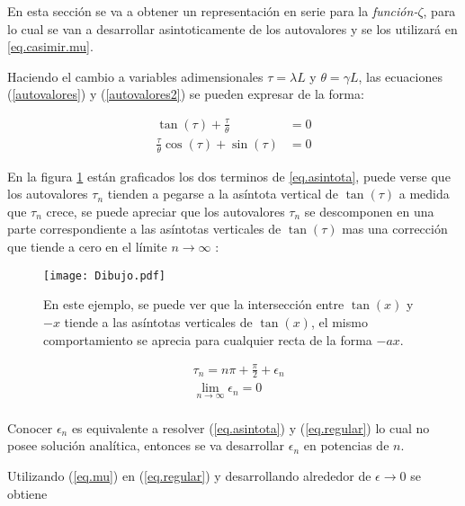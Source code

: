 En esta sección se va a obtener un representación en serie para la {\it función-$\zeta$}, para lo cual se van a desarrollar asintoticamente de los autovalores y se los utilizará en  \ref{eq.casimir.mu}.

Haciendo el cambio a variables adimensionales $\tau = \lambda L $ y $\theta = \gamma L $, las ecuaciones (\ref{autovalores}) y (\ref{autovalores2}) se pueden expresar de la forma:

\begin{align}
    \tan (\tau) + \frac{\tau}{\theta} &= 0 \label{eq.asintota} \\[5pt]
    \frac{\tau}{\theta} \cos( \tau ) + \sin( \tau ) &= 0 \label{eq.regular}
\end{align}



En la figura \ref{fig:Dibujo1} están graficados los dos terminos de \ref{eq.asintota}, puede verse que los autovalores $\tau _n$ tienden a pegarse a la asíntota vertical de $ \tan ( \tau ) $ a medida que $\tau _n$ crece, se puede apreciar que los autovalores $\tau _n$ se descomponen en una parte correspondiente a las asíntotas verticales de $ \tan ( \tau )$ mas una corrección que tiende a cero en el límite $ n  \rightarrow \infty$ :

\begin{figure}
    \centering
    \texttt{[image: Dibujo.pdf]}
    \caption{En este ejemplo, se puede ver que la intersección entre $ \tan(x)$ y $-x$ tiende a las asíntotas verticales de $\tan (x) $, el mismo comportamiento se aprecia para cualquier recta de la forma $- a x$.}
    \label{fig:Dibujo1}
\end{figure}

\begin{equation}
\begin{aligned}
    & \tau _n = n \pi + \frac{\pi}{2} + \epsilon _n \\[5pt]
    & \lim \limits_{ n \rightarrow \infty} \epsilon _n = 0 \\
\end{aligned}
\label{eq.mu}
\end{equation}


Conocer $\epsilon _n $ es equivalente a resolver (\ref{eq.asintota}) y (\ref{eq.regular}) lo cual no posee solución analítica, entonces se va desarrollar $\epsilon _n $ en potencias de $n$.

Utilizando (\ref{eq.mu}) en (\ref{eq.regular}) y desarrollando alrededor de $\epsilon \rightarrow{0}$ se obtiene

